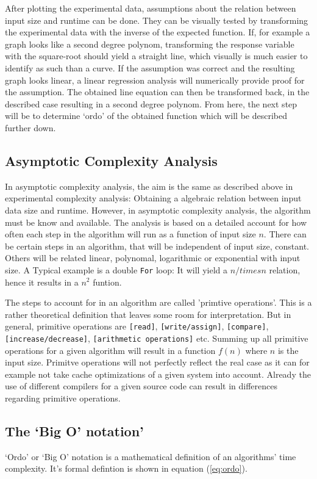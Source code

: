 \documentclass[a4paper,11pt,twoside]{article}
\begin{document}
After plotting the experimental data, assumptions about the relation
between input size and runtime can be done. They can be visually tested
by transforming the experimental data with the inverse of the expected
function. If, for example a graph looks like a second degree polynom,
transforming the response variable with the square-root should yield a
straight line, which visually is much easier to identify as such than
a curve. If the assumption was correct and the resulting graph looks
linear, a linear regression analysis will numerically provide proof
for the assumption. The obtained line equation can then be
transformed back, in the described case resulting in a second degree 
polynom. From here, the next step will be to determine `ordo' of the
obtained function which will be described further down.

\subsection{Asymptotic Complexity Analysis}
In asymptotic complexity analysis, the aim is the same as described
above in experimental complexity analysis: Obtaining a algebraic
relation between input data size and runtime. However, in asymptotic
complexity analysis, the algorithm must be know and available. The
analysis is based on a detailed account for how often each step in the
algorithm will run as a function of input size $n$. There can be
certain steps in an algorithm, that will be independent of input
size, constant. Others will be related linear, polynomal, logarithmic
or exponential with input size. A Typical example is a double
\verb!For! loop: It will yield a $n /times n$ relation, hence it
results in a $n^2$ funtion.

The steps to account for in an algorithm are called 'primtive
operations'. This is a rather theoretical definition that leaves some
room for interpretation. But in general, primitive operations are
\verb![read]!, \verb![write/assign]!, \verb![compare]!,
\verb![increase/decrease]!, \verb![arithmetic operations]! etc. Summing up
all primitive operations for a given algorithm will result in a
function $f(n)$ where $n$ is the input size. Primitve operations will
not perfectly reflect the real case as it can for example not take 
cache optimizations of a given system into account. Already the use of
different compilers for a given source code can result in differences
regarding primitive operations. 

\subsection{The `Big O' notation'}
`Ordo' or `Big O' notation is a mathematical definition of an algorithms'
time complexity. It's formal defintion is shown in equation
(\ref{eq:ordo})\cite[pp. 245]{janlert2000}.  
\end{document}
